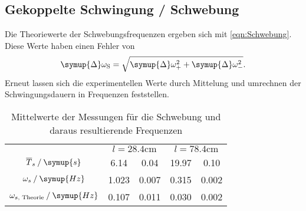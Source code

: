 \subsection{Gekoppelte Schwingung / Schwebung}
\label{subsec:Schwebung}
Die Theoriewerte der Schwebungsfrequenzen ergeben sich mit \autoref{eqn:Schwebung}. Diese Werte haben einen Fehler von
\begin{equation}
    \label{eqn:DeltaOmega_s}
    \symup{\Delta}\omega_{\text{S}} = \sqrt{\symup{\Delta}\omega_+^2 + \symup{\Delta}\omega_-^2}.
\end{equation}
Erneut lassen sich die experimentellen Werte durch Mittelung und umrechnen der Schwingungsdauern in Frequenzen feststellen.

\begin{table}
    \centering
    \caption{Mittelwerte der Messungen für die Schwebung und daraus resultierende Frequenzen}
    \begin{tabular}{c S @{${}\pm{}$} S S[table-format=2.3] @{${}\pm{}$} S[table-format=1.3]}
    \toprule
    &  &  \\
    \cmidrule(lr){2-3}\cmidrule(lr){4-5}
    {$\overline{T}_s \mathbin{/} \symup{s}$}                & 6.14  & 0.04  & 19.97 & 0.10 \\
    {$\omega_s \mathbin{/} \symup{Hz}$}                     & 1.023 & 0.007 & 0.315 & 0.002 \\
    {$\omega_{{s}\text{, Theorie}} \mathbin{/} \symup{Hz}$} & 0.107 & 0.011 & 0.030 & 0.002 \\
    \bottomrule
    \end{tabular}
\end{table}